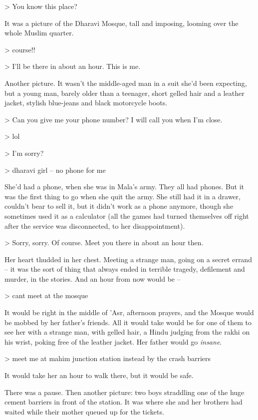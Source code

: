 \textgreater{} You know this place?

It was a picture of the Dharavi Mosque, tall and imposing, looming
over the whole Muslim quarter.

\textgreater{} course!!

\textgreater{} I'll be there in about an hour. This is me.

Another picture. It wasn't the middle-aged man in a suit she'd been
expecting, but a young man, barely older than a teenager, short
gelled hair and a leather jacket, stylish blue-jeans and black
motorcycle boots.

\textgreater{} Can you give me your phone number? I will call you
when I'm close.

\textgreater{} lol

\textgreater{} I'm sorry?

\textgreater{} dharavi girl -- no phone for me

She'd had a phone, when she was in Mala's army. They all had
phones. But it was the first thing to go when she quit the army.
She still had it in a drawer, couldn't bear to sell it, but it
didn't work as a phone anymore, though she sometimes used it as a
calculator (all the games had turned themselves off right after the
service was disconnected, to her disappointment).

\textgreater{} Sorry, sorry. Of course. Meet you there in about an
hour then.

Her heart thudded in her chest. Meeting a strange man, going on a
secret errand -- it was the sort of thing that always ended in
terrible tragedy, defilement and murder, in the stories. And an
hour from now would be --

\textgreater{} cant meet at the mosque

It would be right in the middle of 'Asr, afternoon prayers, and the
Mosque would be mobbed by her father's friends. All it would take
would be for one of them to see her with a strange man, with gelled
hair, a Hindu judging from the rakhi on his wrist, poking free of
the leather jacket. Her father would go \emph{insane}.

\textgreater{} meet me at mahim junction station instead by the
crash barriers

It would take her an hour to walk there, but it would be safe.

There was a pause. Then another picture: two boys straddling one of
the huge cement barriers in front of the station. It was where she
and her brothers had waited while their mother queued up for the
tickets.

